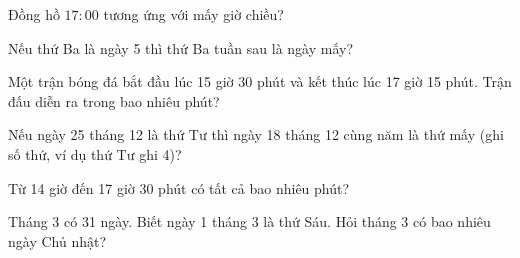 \begin{ex} %
Đồng hồ $17:00$ tương ứng với mấy giờ chiều?
\end{ex}

\begin{ex} %
Nếu thứ Ba là ngày 5 thì thứ Ba tuần sau là ngày mấy?
\end{ex}

\begin{ex} %
Một trận bóng đá bắt đầu lúc 15 giờ 30 phút và kết thúc lúc 17 giờ 15 phút. Trận đấu diễn ra trong bao nhiêu phút?
\end{ex}

\begin{ex} %
Nếu ngày 25 tháng 12 là thứ Tư thì ngày 18 tháng 12 cùng năm là thứ mấy (ghi số thứ, ví dụ thứ Tư ghi 4)?
\end{ex}

\begin{ex} %
Từ 14 giờ đến 17 giờ 30 phút có tất cả bao nhiêu phút?
\end{ex}

\begin{ex} %
Tháng 3 có 31 ngày. Biết ngày 1 tháng 3 là thứ Sáu. Hỏi tháng 3 có bao nhiêu ngày Chủ nhật?
\end{ex}
